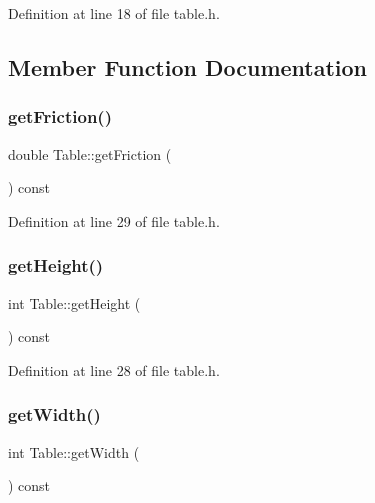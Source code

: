 Definition at line 18 of file table.\+h.



\subsection{Member Function Documentation}
\mbox{\label{class_table_a250960dffeb3fa744bf098a49ef78d8a}} 
\subsubsection{\texorpdfstring{get\+Friction()}{getFriction()}}
{\footnotesize\ttfamily double Table\+::get\+Friction (\begin{DoxyParamCaption}{ }\end{DoxyParamCaption}) const\hspace{0.3cm}{\ttfamily [inline]}}



Definition at line 29 of file table.\+h.

\mbox{\label{class_table_a3c40550751e65b563b3f1759bd12985c}} 
\subsubsection{\texorpdfstring{get\+Height()}{getHeight()}}
{\footnotesize\ttfamily int Table\+::get\+Height (\begin{DoxyParamCaption}{ }\end{DoxyParamCaption}) const\hspace{0.3cm}{\ttfamily [inline]}}



Definition at line 28 of file table.\+h.

\mbox{\label{class_table_a767798fbd671c4c6805091a116439444}} 
\subsubsection{\texorpdfstring{get\+Width()}{getWidth()}}
{\footnotesize\ttfamily int Table\+::get\+Width (\begin{DoxyParamCaption}{ }\end{DoxyParamCaption}) const\hspace{0.3cm}{\ttfamily [inline]}}



